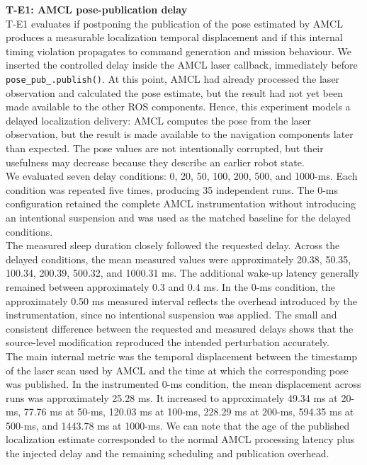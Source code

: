 \noindent \textbf{T-E1: AMCL pose-publication delay}
\\
T-E1 evaluates if postponing the publication of the pose estimated by AMCL produces a measurable localization temporal displacement and if this internal timing violation propagates to command generation and mission behaviour. We inserted the controlled delay inside the AMCL laser callback, immediately before 
\\
\texttt{pose\_pub\_.publish()}. At this point, AMCL had already processed the laser observation and calculated the pose estimate, but the result had not yet been made available to the other ROS components. Hence, this experiment models a delayed localization delivery: AMCL computes the pose from the laser observation, but the result is made available to the navigation components later than expected. The pose values are not intentionally corrupted, but their usefulness may decrease because they describe an earlier robot state.
\\
We evaluated seven delay conditions: 0, 20, 50, 100, 200, 500, and 1000-ms. Each condition was repeated five times, producing 35 independent runs. The 0-ms configuration retained the complete AMCL instrumentation without introducing an intentional suspension and was used as the matched baseline for the delayed conditions.
\\
The measured sleep duration closely followed the requested delay. Across the delayed conditions, the mean measured values were approximately 20.38, 50.35, 100.34, 200.39, 500.32, and 1000.31 ms. The additional wake-up latency generally remained between approximately 0.3 and 0.4 ms. In the 0-ms condition, the approximately 0.50 ms measured interval reflects the overhead introduced by the instrumentation, since no intentional suspension was applied. The small and consistent difference between the requested and measured delays shows that the source-level modification reproduced the intended perturbation accurately.
\\
The main internal metric was the temporal displacement between the timestamp of the laser scan used by AMCL and the time at which the corresponding pose was published. In the instrumented 0-ms condition, the mean displacement across runs was approximately 25.28 ms. It increased to approximately 49.34 ms at 20-ms, 77.76 ms at 50-ms, 120.03 ms at 100-ms, 228.29 ms at 200-ms, 594.35 ms at 500-ms, and 1443.78 ms at 1000-ms. We can note that the age of the published localization estimate corresponded to the normal AMCL processing latency plus the injected delay and the remaining scheduling and publication overhead.
